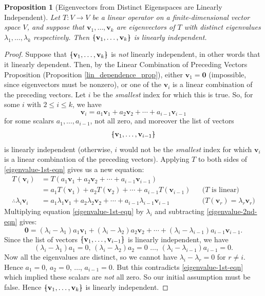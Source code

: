 \documentclass[a4paper,11pt]{book}
\newtheorem{proposition}[theorem]{Proposition}
\theoremstyle{definition}
\newcommand{\ve}[1]{\mathbf{#1}}
\newcommand{\bmark}{\raisebox{.53ex}{\rule{.2em}{.1ex}}}
\newcommand{\bopen}{{\protect\ooalign{\{\cr\hfil\bmark\hfil\cr}}}
\newcommand{\bclose}{{\protect\ooalign{\}\cr\hfil\bmark\hfil\cr}}}
\begin{document}
\begin{proposition}[Eigenvectors from Distinct Eigenspaces are Linearly Independent] \label{lin_ind_eig_distinct} Let $T : V \rightarrow V$ be a linear operator on a finite-dimensional vector space $V$, and suppose that $\ve{v}_1, \ldots, \ve{v}_k$ are eigenvectors of $T$ with distinct eigenvalues $\lambda_1, \ldots, \lambda_k$ respectively. Then $\bopen \ve{v}_1, \ldots, \ve{v}_k \bclose$ is linearly independent.
\end{proposition}
\begin{proof}
Suppose that $\bopen \ve{v}_1, \ldots, \ve{v}_k \bclose$ is {\em not} linearly independent, in other words that it linearly dependent. Then, by the Linear Combination of Preceding Vectors Proposition (Proposition \ref{lin_dependence_prop}), either $\ve{v}_1 = \ve{0}$ (impossible, since eigenvectors must be nonzero), or one of the $\ve{v}_i$ is a linear combination of the preceding vectors. Let $i$ be the {\em smallest} index for which this is true. So, for some $i$ with $2 \leq i \leq k$, we have
\begin{equation} \label{eigenvalue-1st-eqn}
 \ve{v}_i = a_1 \ve{v}_1 + a_2 \ve{v}_2 + \cdots + a_{i-1} \ve{v}_{i-1}
\end{equation}
for some scalars $a_1, \ldots, a_{i-1}$, not all zero, and moreover the list of vectors 
\[
 \bopen \ve{v}_1, \ldots, \ve{v}_{i-1} \bclose
\]
is linearly independent (otherwise, $i$ would not be the {\em smallest} index for which $\ve{v}_i$ is a linear combination of the preceding vectors). Applying $T$ to both sides of \eqref{eigenvalue-1st-eqn} gives us a new equation:
\begin{align}
 T(\ve{v}_i) &= T(  a_1 \ve{v}_1 + a_2 \ve{v}_2 + \cdots + a_{i-1} \ve{v}_{i-1}) \nonumber   \\
  &= a_1 T(\ve{v}_1) + a_2 T(\ve{v}_2) + \cdots + a_{i-1} T(\ve{v}_{i-1}) && \mbox{($T$ is linear)}\nonumber \\
  \therefore \lambda_i \ve{v}_i &= a_1 \lambda_1 \ve{v}_1 + a_2 \lambda_2 \ve{v}_2 + \cdots + a_{i-1} \lambda_{i-1} \ve{v}_{i-1} && \mbox{($T(\ve{v}_r) = \lambda_r \ve{v}_r$)}  \label{eigenvalue-2nd-eqn}
\end{align}
Multiplying equation \eqref{eigenvalue-1st-eqn} by $\lambda_i$ and subtracting \eqref{eigenvalue-2nd-eqn} gives:
\[
 \ve{0} = (\lambda_i - \lambda_1) a_1 \ve{v}_1 + (\lambda_i - \lambda_2) a_2 \ve{v}_2 + \cdots + (\lambda_i - \lambda_{i-1}) a_{i-1} \ve{v}_{i-1}.
\]
Since the list of vectors $\bopen \ve{v}_1, \ldots, \ve{v}_{i-1} \bclose$ is linearly independent, we have
\[
(\lambda_i - \lambda_1) a_1 =0, \, (\lambda_i - \lambda_2) a_2 =0\, \, \ldots, \,  (\lambda_i - \lambda_{i-1}) a_{i-1}=0.
\] 
Now all the eigenvalues are distinct, so we cannot have $\lambda_i - \lambda_r = 0$ for $r \neq i$. Hence $a_1 = 0$, $a_2 = 0$, $\ldots$, $a_{i-1} = 0$. But this contradicts \eqref{eigenvalue-1st-eqn} which implied these scalars are {\em not} all zero. So our initial assumption must be false. Hence  $\bopen \ve{v}_1, \ldots, \ve{v}_k \bclose$ is linearly independent.
\end{proof}
\end{document}

